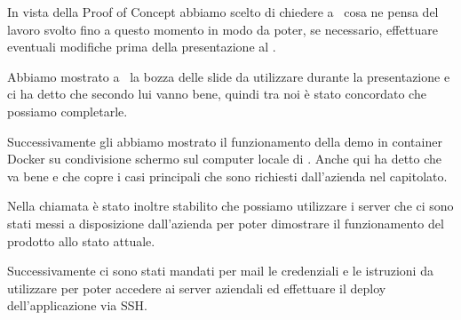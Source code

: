     	In vista della Proof of Concept abbiamo scelto di chiedere a \DZ~cosa ne pensa del lavoro svolto fino a questo momento in modo da poter, se necessario, effettuare eventuali modifiche prima della presentazione al \RC.
    	
    	Abbiamo mostrato a \DZ~la bozza delle slide da utilizzare durante la presentazione e ci ha detto che secondo lui vanno bene, quindi tra noi è stato concordato che possiamo completarle.
    	
    	Successivamente gli abbiamo mostrato il funzionamento della demo in container Docker su condivisione schermo sul computer locale di \CV.
		Anche qui ha detto che va bene e che copre i casi principali che sono richiesti dall'azienda nel capitolato.
		
    	Nella chiamata è stato inoltre stabilito che possiamo utilizzare i server che ci sono stati messi a disposizione dall'azienda per poter dimostrare il funzionamento del prodotto allo stato attuale.
    	
    	Successivamente ci sono stati mandati per mail le credenziali e le istruzioni da utilizzare per poter accedere ai server aziendali ed effettuare il deploy dell'applicazione via SSH.
    	
